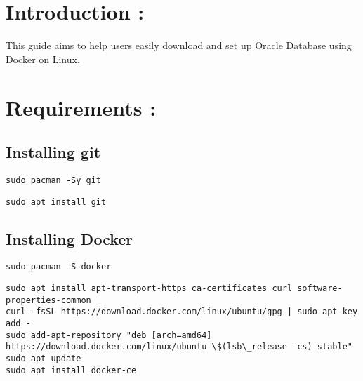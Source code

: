 \documentclass{article}
\begin{document}
\section{Introduction : }
This guide aims to help users easily download and set up Oracle Database using Docker on Linux.
\section{Requirements : }

\subsection{Installing git}

\vspace{0.25cm}
\begin{tcolorbox}[title = Arch Based]
    \begin{verbatim}
sudo pacman -Sy git
    \end{verbatim}
\end{tcolorbox}

\vspace{0.5cm}
\begin{tcolorbox}[title = Debian And Ubuntu Based]
    \begin{verbatim}
sudo apt install git
    \end{verbatim}
\end{tcolorbox}

\vspace{0.25cm}
\subsection{Installing Docker}

\vspace{0.25cm}
\begin{tcolorbox}[title = Arch Based]
    \begin{verbatim}
sudo pacman -S docker
   \end{verbatim}
\end{tcolorbox}

\vspace{0.5cm}
\begin{tcolorbox}[title = Debian and Ubuntu Based]
    \begin{verbatim}
sudo apt install apt-transport-https ca-certificates curl software-properties-common
curl -fsSL https://download.docker.com/linux/ubuntu/gpg | sudo apt-key add -
sudo add-apt-repository "deb [arch=amd64] https://download.docker.com/linux/ubuntu \$(lsb\_release -cs) stable"
sudo apt update
sudo apt install docker-ce
 \end{verbatim}
\end{tcolorbox}
\end{document}
